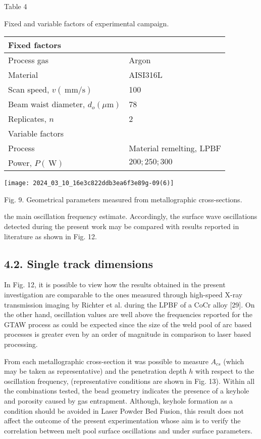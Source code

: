 \documentclass[10pt]{article}
\begin{document}
Table 4

Fixed and variable factors of experimental campaign.

\begin{center}
\begin{tabular}{ll}
\hline
Fixed factors &  \\
\hline
Process gas & Argon \\
Material & AISI316L \\
Scan speed, $v(\mathrm{~mm} / \mathrm{s})$ & 100 \\
Beam waist diameter, $d_{o}(\mu \mathrm{m})$ & 78 \\
Replicates, $n$ & 2 \\
Variable factors &  \\
Process & Material remelting, LPBF \\
Power, $P(\mathrm{~W})$ & $200 ; 250 ; 300$ \\
\end{tabular}
\end{center}

\begin{center}
\texttt{[image: 2024\_03\_10\_16e3c822ddb3ea6f3e89g-09(6)]}
\end{center}

Fig. 9. Geometrical parameters measured from metallographic cross-sections.

the main oscillation frequency estimate. Accordingly, the surface wave oscillations detected during the present work may be compared with results reported in literature as shown in Fig. 12.

\subsection*{4.2. Single track dimensions}
In Fig. 12, it is possible to view how the results obtained in the present investigation are comparable to the ones measured through high-speed X-ray transmission imaging by Richter et al. during the LPBF of a $\mathrm{CoCr}$ alloy [29]. On the other hand, oscillation values are well above the frequencies reported for the GTAW process as could be expected since the size of the weld pool of arc based processes is greater even by an order of magnitude in comparison to laser based processing.

From each metallographic cross-section it was possible to measure $A_{c s}$ (which may be taken as representative) and the penetration depth $h$ with respect to the oscillation frequency, (representative conditions are shown in Fig. 13). Within all the combinations tested, the bead geometry indicates the presence of a keyhole and porosity caused by gas entrapment. Although, keyhole formation as a condition should be avoided in Laser Powder Bed Fusion, this result does not affect the outcome of the present experimentation whose aim is to verify the correlation between melt pool surface oscillations and under surface parameters.
\end{document}
